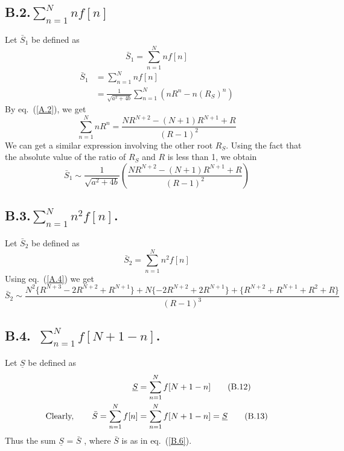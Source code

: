 \begin{multicols}{2}
\subsection*{B.2.\quad $\displaystyle{\sum_{n=1}^{N}n f[n]}$}\label{app-B-B.2}
Let $\bar{S}_1$ be defined as 
\begin{equation}
\bar{S}_1 = \displaystyle{\sum_{n=1}^N nf[n]}\tag{B.7}\label{B.7}
\end{equation}
\begin{align}
\bar{S}_1 &= \displaystyle{\sum_{n=1}^N nf[n]} \nonumber\\
&= \frac{1}{\sqrt{a^2 + 4b}} \displaystyle{\sum_{n=1}^N{(n R^n -  n(R_S)^n)}}\nonumber
\end{align}
By eq.~(\ref{A.2}), we get
\begin{equation}
\displaystyle{\sum_{n=1}^N }nR^n = \frac{NR^{N+2}-(N+1)R^{N+1}+R}{(R-1)^2}\tag{B.8}\label{B.8}
\end{equation}
We can get a similar expression involving the other root $R_S$. Using the fact that the absolute value of the ratio of $R_S$ and $R$ is less than 1, we obtain 
\begin{equation}
\bar{S}_1 \sim \frac{1}{\sqrt{a^2 + 4b}}\left(\frac{NR^{N+2}-(N+1)R^{N+1}+R}{(R-1)^2}\right)\tag{B.9}\label{B.9}
\end{equation}

\subsection*{B.3.\quad $\displaystyle{\sum_{n=1}^{N}n^2 f[n]}$.}
Let $\bar{S}_2$ be defined as
 \begin{equation}
 \bar{S}_2 = \displaystyle{\sum_{n=1}^{N}n^2 f[n]}\tag{B.10}\label{B.10}
 \end{equation}
 Using eq.~(\ref{A.4}) we get 
 {\fontsize{5}{6}\selectfont\begin{equation*}
 \bar{S}_2 \sim \frac{N^2\{R^{N+3}-2R^{N+2}+R^{N+1}\}+N\{-2R^{N+2}+2R^{N+1}\}+ \{R^{N+2}+R^{N+1}+R^2+R\}}{(R-1)^3}\tag{B.11}\label{B.11}
\end{equation*}}

\vspace{-.5cm}

\subsection*{B.4.~$\displaystyle{\sum_{n=1}^{N}f[N+1-n]}$.}
Let $\underline{S}$ be defined as
\begin{align}
\underline{S} &= \displaystyle{\sum_{n=1}^{N}f[N+1-n]}\tag{B.12}\label{B.12}\\
\textup{Clearly,} \hspace{0.3in} \bar{S} = \displaystyle{\sum_{n=1}^{N}f[n]} &= \displaystyle{\sum_{n=1}^{N}f[N+1-n]} = \underline{S}\tag{B.13}\label{B.13}
\end{align}
Thus the sum $\underline{S}$ = $\bar{S}$ , where $\bar{S}$ is as in eq.~(\ref{B.6}).


\end{multicols}
